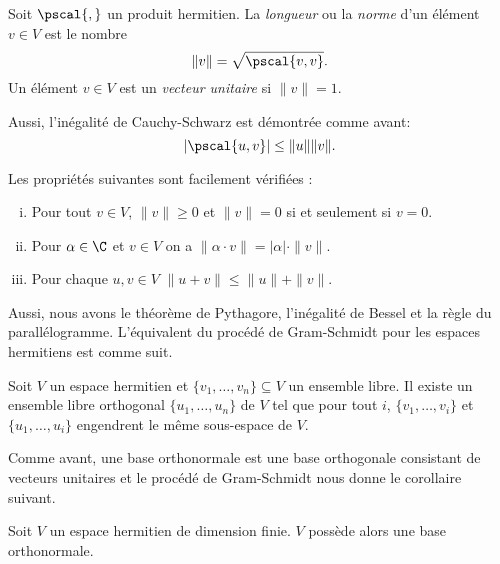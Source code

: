 \begin{definition}
  \label{def:h5}
  Soit $\pscal{,}$ un produit hermitien. La \emph{longueur} ou la \emph{norme} d'un élément $v \in V$ est le nombre 
  \begin{displaymath}
    \| v \| = \sqrt{\pscal{v,v}}.
  \end{displaymath}
  Un élément $v \in V$ est un \emph{vecteur unitaire} si $\|v\| = 1$. 
\end{definition}

Aussi, l'inégalité de Cauchy-Schwarz est démontrée comme avant: 
\begin{equation}
  \label{eq:6}
  | \pscal{u,v}| \leq \|u\| \|v\|. 
\end{equation}


Les propriétés suivantes sont facilement vérifiées :
\begin{enumerate}[i)]
\item Pour tout $v \in V$, $\|v\|\geq 0$ et $\|v\| = 0$ si et seulement si $v = 0$. \label{item:8}
\item Pour $\alpha \in \C$ et $v \in V$ on a $\| \alpha \cdot v \| = |\alpha| \cdot \|v\|$. \label{item:9}
\item Pour chaque $u,v \in V$ $\|u+v\| \leq \|u\| + \|v\|$. \label{tr:2}
\end{enumerate}

Aussi, nous avons le théorème de Pythagore, l'inégalité de Bessel et la règle du parallélogramme.  
L'équivalent du procédé de Gram-Schmidt pour les espaces hermitiens est comme suit. 


\begin{theorem}
\label{thr:12}
  Soit $V$ un espace hermitien et  $\{v_1,\dots,v_n\} \subseteq V$
  un ensemble libre.  
  Il existe un ensemble libre orthogonal $\{u_1,\dots,u_n\}$
  de $V$
  tel que pour tout $i$,
  $\{v_1,\dots,v_i\}$
  et $\{u_1,\dots,u_i\}$ engendrent le même sous-espace de $V$.
\end{theorem}

Comme avant, une base orthonormale est une base orthogonale consistant
de vecteurs unitaires et le procédé de Gram-Schmidt nous donne le
corollaire suivant.

\begin{corollary}
  \label{co:6}
  Soit $V$
  un espace hermitien de dimension finie.  $V$
  possède alors une base orthonormale.
\end{corollary}



